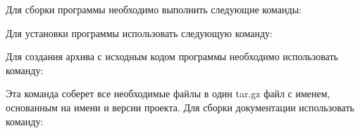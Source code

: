 Для сборки программы необходимо выполнить следующие команды\+:


\begin{DoxyCode}{0}

\end{DoxyCode}


Для установки программы использовать следующую команду\+:


\begin{DoxyCode}{0}

\end{DoxyCode}


Для создания архива с исходным кодом программы необходимо использовать команду\+:


\begin{DoxyCode}{0}

\end{DoxyCode}


Эта команда соберет все необходимые файлы в один tar.\+gz файл с именем, основанным на имени и версии проекта. Для сборки документации использовать команду\+:


\begin{DoxyCode}{0}

\end{DoxyCode}
 